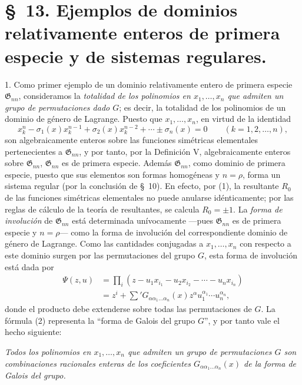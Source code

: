 \documentclass[11pt]{article}
\providecommand{\Gdom}{\mathfrak{G}}
\begin{document}
\section*{\S\ 13. Ejemplos de dominios relativamente enteros de primera especie y de sistemas regulares.}

1. Como primer ejemplo de un dominio relativamente entero de primera especie $\Gdom_{nn}$, consideramos la \emph{totalidad de los polinomios en $x_1,\ldots,x_n$ que admiten un grupo de permutaciones dado $G$}; es decir, la totalidad de los polinomios de un dominio de género de Lagrange. Puesto que $x_1,\ldots,x_n$, en virtud de la identidad
\begin{equation}
  x_k^n-\sigma_1(x)x_k^{n-1}+\sigma_2(x)x_k^{n-2}+\cdots\pm\sigma_n(x)=0
  \qquad(k=1,2,
\ldots,n),
\tag{1}
\end{equation}
son algebraicamente enteros sobre las funciones simétricas elementales pertenecientes a $\Gdom_{nn}$, y por tanto, por la Definición V, algebraicamente enteros sobre $\Gdom_{nn}$, $\Gdom_{nn}$ es de primera especie. Además $\Gdom_{nn}$, como dominio de primera especie, puesto que sus elementos son formas homogéneas y $n=\rho$, forma un sistema regular (por la conclusión de \S\ 10). En efecto, por (1), la resultante $R_0$ de las funciones simétricas elementales no puede anularse idénticamente; por las reglas de cálculo de la teoría de resultantes, se calcula $R_0=\pm1$. La \emph{forma de involución} de $\Gdom_{nn}$ está determinada unívocamente ---pues $\Gdom_{nn}$ es de primera especie y $n=\rho$--- como la forma de involución del correspondiente dominio de género de Lagrange. Como las cantidades conjugadas a $x_1,\ldots,x_n$ con respecto a este dominio surgen por las permutaciones del grupo $G$, esta forma de involución está dada por
\begin{equation}
\begin{aligned}
  \Psi(z,u)&=\prod_i
  (z-u_1x_{i_1}-u_2x_{i_2}-\cdots-u_nx_{i_n})\\
  &=z^i+\sum{}'G_{\alpha\alpha_1\ldots\alpha_n}(x)
  z^\alpha u_1^{\alpha_1}\cdots u_n^{\alpha_n},
\end{aligned}
\tag{2}
\end{equation}
donde el producto debe extenderse sobre todas las permutaciones de $G$. La fórmula (2) representa la ``forma de Galois del grupo $G$'', y por tanto vale el hecho siguiente:

\emph{Todos los polinomios en $x_1,\ldots,x_n$ que admiten un grupo de permutaciones $G$ son combinaciones racionales enteras de los coeficientes $G_{\alpha\alpha_1\ldots\alpha_n}(x)$ de la forma de Galois del grupo.}
\end{document}
